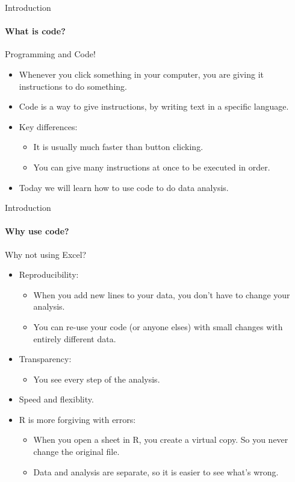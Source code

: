 \documentclass[ignorenonframetext,]{beamer}
\providecommand{\tightlist}{%
  \setlength{\itemsep}{0pt}\setlength{\parskip}{0pt}}
\begin{document}
\begin{frame}{Introduction}

\framesubtitle{What is code?}

Programming and Code!

\begin{itemize}
\tightlist
\item
  Whenever you click something in your computer, you are giving it
  instructions to do something.
\item
  Code is a way to give instructions, by writing text in a specific
  language.
\item
  Key differences:

  \begin{itemize}
  \tightlist
  \item
    It is usually much faster than button clicking.
  \item
    You can give many instructions at once to be executed in order.
  \end{itemize}
\item
  Today we will learn how to use code to do data analysis.
\end{itemize}

\end{frame}

\begin{frame}{Introduction}

\framesubtitle{Why use code?}

Why not using Excel?

\begin{itemize}
\tightlist
\item
  Reproducibility:

  \begin{itemize}
  \tightlist
  \item
    When you add new lines to your data, you don't have to change your
    analysis.
  \item
    You can re-use your code (or anyone elses) with small changes with
    entirely different data.
  \end{itemize}
\item
  Transparency:

  \begin{itemize}
  \tightlist
  \item
    You see every step of the analysis.
  \end{itemize}
\item
  Speed and flexiblity.
\item
  R is more forgiving with errors:

  \begin{itemize}
  \tightlist
  \item
    When you open a sheet in R, you create a virtual copy. So you never
    change the original file.\\
  \item
    Data and analysis are separate, so it is easier to see what's wrong.
  \end{itemize}
\end{itemize}

\end{frame}
\end{document}
